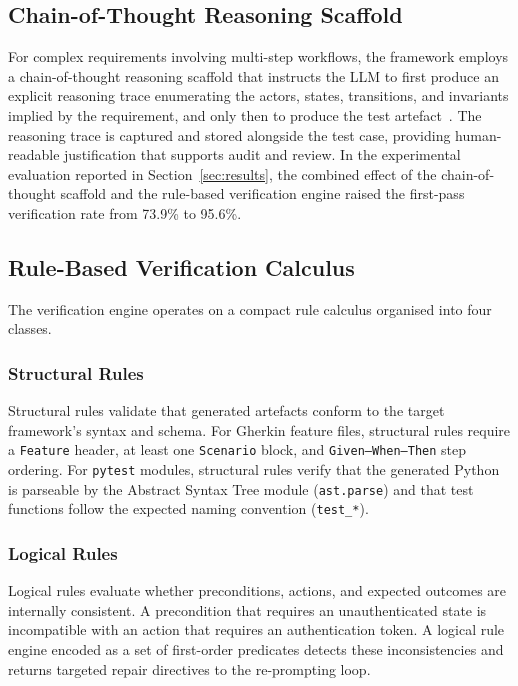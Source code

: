 \documentclass[11pt,letterpaper]{article}
\begin{document}
\subsection{Chain-of-Thought Reasoning Scaffold}

For complex requirements involving multi-step workflows, the framework employs a chain-of-thought reasoning scaffold that instructs the LLM to first produce an explicit reasoning trace enumerating the actors, states, transitions, and invariants implied by the requirement, and only then to produce the test artefact~\cite{cot2022}. The reasoning trace is captured and stored alongside the test case, providing human-readable justification that supports audit and review. In the experimental evaluation reported in Section~\ref{sec:results}, the combined effect of the chain-of-thought scaffold and the rule-based verification engine raised the first-pass verification rate from 73.9\% to 95.6\%.

\subsection{Rule-Based Verification Calculus}

The verification engine operates on a compact rule calculus organised into four classes.

\subsubsection{Structural Rules}
Structural rules validate that generated artefacts conform to the target framework's syntax and schema. For Gherkin feature files, structural rules require a \texttt{Feature} header, at least one \texttt{Scenario} block, and \texttt{Given--When--Then} step ordering. For \texttt{pytest} modules, structural rules verify that the generated Python is parseable by the Abstract Syntax Tree module (\texttt{ast.parse}) and that test functions follow the expected naming convention (\texttt{test\_*}).

\subsubsection{Logical Rules}
Logical rules evaluate whether preconditions, actions, and expected outcomes are internally consistent. A precondition that requires an unauthenticated state is incompatible with an action that requires an authentication token. A logical rule engine encoded as a set of first-order predicates detects these inconsistencies and returns targeted repair directives to the re-prompting loop.
\end{document}
